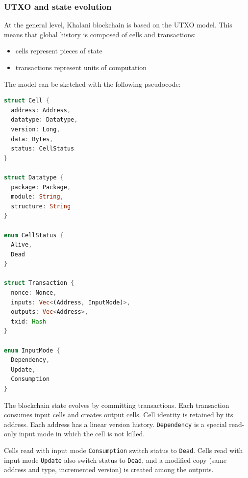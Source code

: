 \documentclass[a4paper]{article}
\newcommand{\code}[1]{{\small \texttt{#1}}}
\begin{document}
\subsubsection{UTXO and state evolution}

At the general level, Khalani blockchain is based on the UTXO model. This means that global history is composed of cells and transactions:

\begin{itemize}
  \item cells represent pieces of state
  \item transactions represent units of computation
\end{itemize}

The model can be sketched with the following pseudocode:


\begin{lstlisting}[language=Rust]
struct Cell {
  address: Address,
  datatype: Datatype,
  version: Long,
  data: Bytes,
  status: CellStatus
}

struct Datatype {
  package: Package,
  module: String,
  structure: String
}

enum CellStatus {
  Alive,
  Dead
}

struct Transaction {
  nonce: Nonce,
  inputs: Vec<(Address, InputMode)>,
  outputs: Vec<Address>,
  txid: Hash
}

enum InputMode {
  Dependency,
  Update,
  Consumption
}
\end{lstlisting}

The blockchain state evolves by committing transactions. Each transaction consumes input cells and creates output cells. Cell identity is retained by its address. Each address has a linear version history. \code{Dependency} is a special read-only input mode in which the cell is not killed.

Cells read with input mode \code{Consumption} switch status to \code{Dead}. Cells read with input mode \code{Update} also switch status to \code{Dead}, and a modified copy (same address and type, incremented version) is created among the outputs.
\end{document}
